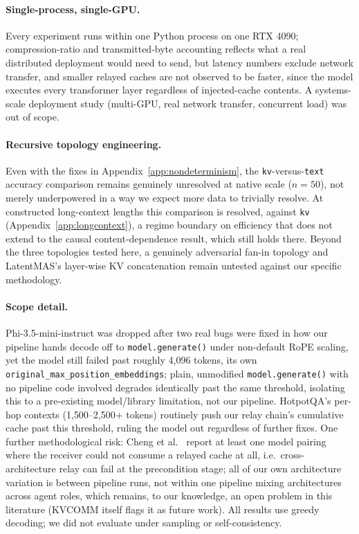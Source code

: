 \documentclass[11pt]{article}
\begin{document}
\paragraph{Single-process, single-GPU.} Every experiment runs within
one Python process on one RTX 4090; compression-ratio and
transmitted-byte accounting reflects what a real distributed deployment
would need to send, but latency numbers exclude network transfer, and
smaller relayed caches are not observed to be faster, since the model
executes every transformer layer regardless of injected-cache contents.
A systems-scale deployment study (multi-GPU, real network transfer,
concurrent load) was out of scope.

\paragraph{Recursive topology engineering.} Even with the fixes in
Appendix~\ref{app:nondeterminism}, the \texttt{kv}-versus-\texttt{text}
accuracy comparison remains genuinely unresolved at native scale
($n=50$), not merely underpowered in a way we expect more data to
trivially resolve. At constructed long-context lengths this comparison
is resolved, against \texttt{kv} (Appendix~\ref{app:longcontext}), a
regime boundary on efficiency that does not extend to the causal
content-dependence result, which still holds there. Beyond the three
topologies tested here, a genuinely adversarial fan-in
topology \citep{latentagentslie2026} and LatentMAS's layer-wise KV
concatenation \citep{latentmas2026} remain untested against our
specific methodology.

\paragraph{Scope detail.} Phi-3.5-mini-instruct was dropped after two
real bugs were fixed in how our pipeline hands decode off to
\texttt{model.generate()} under non-default RoPE scaling, yet the model
still failed past roughly 4{,}096 tokens, its own
\texttt{original\_max\_position\_embeddings}; plain, unmodified
\texttt{model.generate()} with no pipeline code involved degrades
identically past the same threshold, isolating this to a pre-existing
model/library limitation, not our pipeline. HotpotQA's per-hop contexts
(1{,}500--2{,}500+ tokens) routinely push our relay chain's cumulative
cache past this threshold, ruling the model out regardless of further
fixes. One further methodological risk: Cheng et al.\
\citep{latentcommpay2026} report at least one model pairing where the
receiver could not consume a relayed cache at all, i.e.\
cross-architecture relay can fail at the precondition stage; all of our
own architecture variation is between pipeline runs, not within one
pipeline mixing architectures across agent roles, which remains, to our
knowledge, an open problem in this literature (KVCOMM itself flags it as
future work). All results use greedy decoding; we did not evaluate
under sampling or self-consistency.
\end{document}
